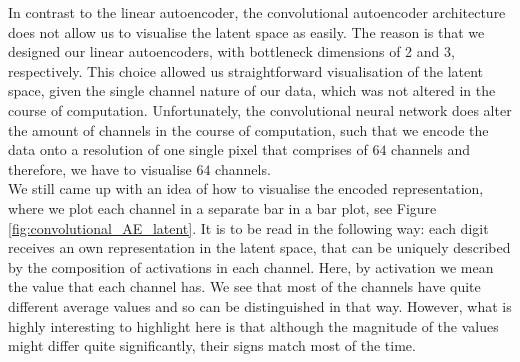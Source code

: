In contrast to the linear autoencoder, the convolutional autoencoder architecture does not allow us to visualise the latent space as easily. The reason is that we designed our linear autoencoders, with bottleneck dimensions of 2 and 3, respectively. This choice allowed us straightforward visualisation of the latent space, given the single channel nature of our data, which was not altered in the course of computation. Unfortunately, the convolutional neural network does alter the amount of channels in the course of computation, such that we encode the data onto a resolution of one single pixel that comprises of $64$ channels and therefore, we have to visualise $64$ channels.\\
We still came up with an idea of how to visualise the encoded representation, where we plot each channel in a separate bar in a bar plot, see Figure \ref{fig:convolutional_AE_latent}. It is to be read in the following way: each digit receives an own representation in the latent space, that can be uniquely described by the composition of activations in each channel. Here, by activation we mean the value that each channel has. We see that most of the channels have quite different average values and so can be distinguished in that way. However, what is highly interesting to highlight here is that although the magnitude of the values might differ quite significantly, their signs match most of the time.



